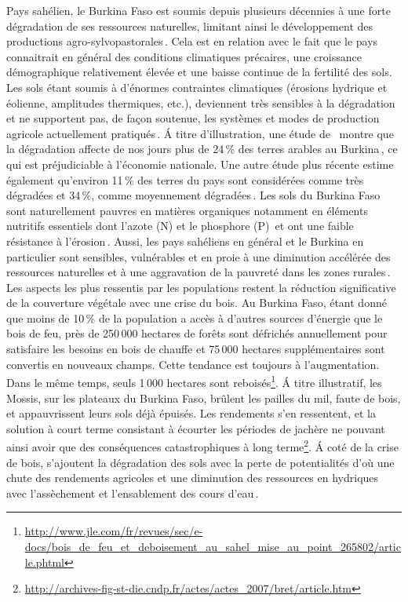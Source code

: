 \documentclass[a4paper,11pt]{article}
\begin{document}
Pays sahélien, le Burkina Faso est soumis depuis plusieurs décennies à
une forte dégradation de ses ressources naturelles, limitant ainsi le
développement des productions
agro-sylvopastorales\,\cite{Thiombiano_2000}. Cela est en relation
avec le fait que le pays connaitrait en général des conditions
climatiques précaires, une croissance démographique relativement
élevée et une baisse continue de la fertilité des sols. Les sols étant
soumis à d’énormes contraintes climatiques (érosions hydrique et
éolienne, amplitudes thermiques, etc.), deviennent très sensibles à la
dégradation et ne supportent pas, de façon soutenue, les systèmes et
modes de production agricole actuellement
pratiqués\,\cite{PANA_2003}. \'{A} titre d’illustration, une étude de
\,\citeauthor{INERA_2003} montre que la dégradation affecte de nos
jours plus de 24\,\% des terres arables au Burkina\,\cite{INERA_2003},
ce qui est préjudiciable à l’économie nationale. Une autre étude plus
récente estime également qu’environ 11\,\% des terres du pays sont
considérées comme très dégradées et 34\,\%, comme moyennement
dégradées\,\cite{SPCONEDD_2006}.  Les sols du Burkina Faso sont
naturellement pauvres en matières organiques notamment en éléments
nutritifs essentiels dont l’azote (N) et le phosphore
(P)\,\cite{Traore_2008} et ont une faible résistance à
l’érosion\,\cite{Berger_1991}. Aussi, les pays sahéliens en général et
le Burkina en particulier sont sensibles, vulnérables et en proie à
une diminution accélérée des ressources naturelles et à une
aggravation de la pauvreté dans les zones
rurales\,\cite{Roose_2004}. Les aspects les plus ressentis par les
populations restent la réduction significative de la couverture
végétale avec une crise du bois. Au Burkina Faso, étant donné que
moins de 10\,\% de la population a accès à d’autres sources d’énergie
que le bois de feu, près de 250\,000 hectares de forêts sont défrichés
annuellement pour satisfaire les besoins en bois de chauffe et 75\,000
hectares supplémentaires sont convertis en nouveaux champs. Cette
tendance est toujours à l’augmentation. Dans le même temps, seuls
1\,000 hectares sont
reboisés\footnote{\url{http://www.jle.com/fr/revues/sec/e-docs/bois_de_feu_et_deboisement_au_sahel_mise_au_point_265802/article.phtml}}. \'{A}
titre illustratif, les Mossis, sur les plateaux du Burkina Faso,
brûlent les pailles du mil, faute de bois, et appauvrissent leurs sols
déjà épuisés. Les rendements s’en ressentent, et la solution à court
terme consistant à écourter les périodes de jachère ne pouvant ainsi
avoir que des conséquences catastrophiques à long
terme\footnote{\url{http://archives-fig-st-die.cndp.fr/actes/actes_2007/bret/article.htm}}.
\'{A} coté de la crise de bois, s’ajoutent la dégradation des sols avec la
perte de potentialités d’où une chute des rendements agricoles et
une diminution des ressources en hydriques avec l’assèchement et
l’ensablement des cours d’eau\,\cite{ZOMBRE_2006}.
\end{document}
